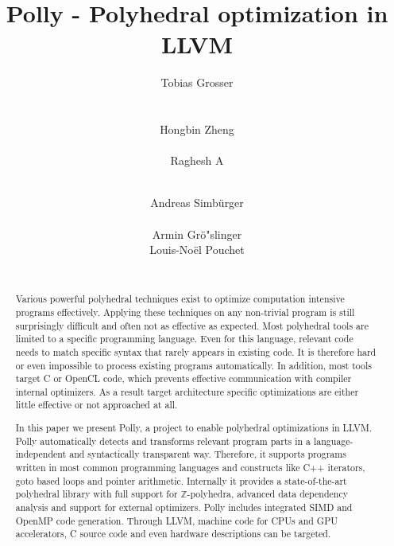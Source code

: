 \documentclass{acm_proc_article-sp}
\begin{document}
\title{Polly - Polyhedral optimization in LLVM}
\author{
\alignauthor
Tobias Grosser\\
\\
\\
\alignauthor
Hongbin Zheng\\
\\
\alignauthor
Raghesh A\\
\\
\and
\alignauthor
Andreas Simb\"urger\\
\\
\alignauthor
Armin Gr\"o"slinger
\\
\alignauthor
Louis-No\"el Pouchet\\
\\
}
\maketitle
\begin{abstract}

Various powerful polyhedral techniques exist to optimize
computation intensive programs effectively.  Applying these techniques on any
non-trivial
program is still surprisingly difficult and often not as effective as expected.
Most polyhedral tools are limited to a specific programming language.  Even for
this language, relevant code needs to match specific syntax that rarely
appears in existing code.  It is therefore hard or even impossible to
process existing programs automatically.  In addition, most tools target C or
OpenCL code, which prevents effective communication with compiler internal
optimizers. As a result target architecture specific optimizations are
either little effective or not approached at all.

In this paper we present Polly, a project to enable polyhedral optimizations in
LLVM. Polly automatically detects and transforms relevant program parts in a
language-independent and syntactically transparent way. Therefore, it supports
programs written in most common programming languages and constructs
like C++ iterators, goto based loops and pointer arithmetic.  Internally it
provides a state-of-the-art polyhedral library with full support for
$\mathbb{Z}$-polyhedra, advanced data dependency analysis and
support for external optimizers. Polly includes integrated SIMD and OpenMP code
generation. Through LLVM, machine code for CPUs and GPU accelerators,
C source code and even hardware descriptions can be targeted.

\end{abstract}
\end{document}
